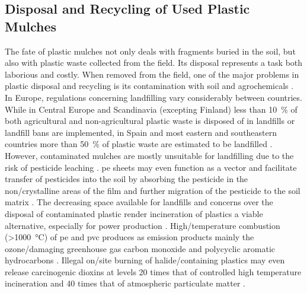 \subsection{Disposal and Recycling of Used Plastic Mulches}
\label{sec:plastic-mulching:recycling}

The fate of plastic mulches not only deals with fragments buried in the soil, but also with plastic waste collected from the field. Its disposal represents a task both laborious and costly. When removed from the field, one of the major problems in plastic disposal and recycling is its contamination with soil and agrochemicals \citep{Gonzalez-SanchezUse2014,Scarascia-MugnozzaPlastic2011}.
In Europe, regulations concerning landfilling vary considerably between countries. While in Central Europe and Scandinavia (excepting Finland) less than \SI{10}{\percent} of both agricultural and non-agricultural plastic waste is disposed of in landfills or landfill bans are implemented, in Spain and most eastern and southeastern countries more than \SI{50}{\percent} of plastic waste are estimated to be landfilled \citep{PlasticsEuropePlastics2015}. However, contaminated mulches are mostly unsuitable for landfilling due to the risk of pesticide leaching \citep{GartheManaging2004,WangSoil2013}. \ac{pe} sheets may even function as a vector and facilitate transfer of pesticides into the soil by absorbing the pesticide in the non\-/crystalline areas of the film \citep{HuckinsLipidcontaining1993,NerinAbsorption1996} and further migration of the pesticide to the soil matrix \citep{RamosPolyethylene2015}. The decreasing space available for landfills and concerns over the disposal of contaminated plastic render incineration of plastics a viable alternative, especially for power production \citep{GartheManaging2004}. High\-/temperature combustion (\SI{>1000}{\degreeCelsius}) of \ac{pe} and \ac{pvc} produces as emission products mainly the ozone\-/damaging greenhouse gas carbon monoxide and polycyclic aromatic hydrocarbons \citep{WangComparative2003}. Illegal on\-/site burning of halide\-/containing plastics may even release carcinogenic dioxins at levels 20 times that of controlled high temperature incineration and 40 times that of atmospheric particulate matter \citep{LevitanRecycling2003}.

